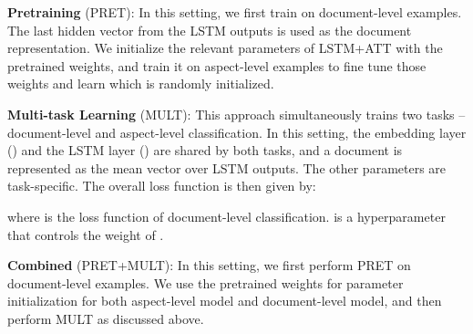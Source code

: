 \documentclass[11pt,a4paper]{article}
\begin{document}
\noindent\textbf{Pretraining} (PRET): In this setting, we first train on document-level examples. The last hidden vector from the LSTM outputs is used as the document representation.
We initialize the relevant parameters  of LSTM+ATT with the pretrained weights, and train it on aspect-level examples to fine tune those weights and learn  which is randomly initialized.
\medskip

\noindent\textbf{Multi-task Learning} (MULT): This approach simultaneously trains two tasks -- document-level and aspect-level classification. In this setting, the embedding layer () and the LSTM layer () are shared by both tasks, and a document is represented as the mean vector over LSTM outputs.  The other parameters are task-specific. The overall loss function is then given by:

where  is the loss function of document-level classification.  is a hyperparameter that controls the weight of .
\medskip

\noindent\textbf{Combined} (PRET+MULT): In this setting, we first perform PRET on document-level examples. We use the pretrained weights for parameter initialization for both aspect-level model and document-level model, and then perform MULT as discussed above.

\renewcommand{\arraystretch}{1.1}
\begin{table}[t]
\centering
\small
{}
\caption{Dataset description.}\label{data statistics}
\end{table}
\end{document}
